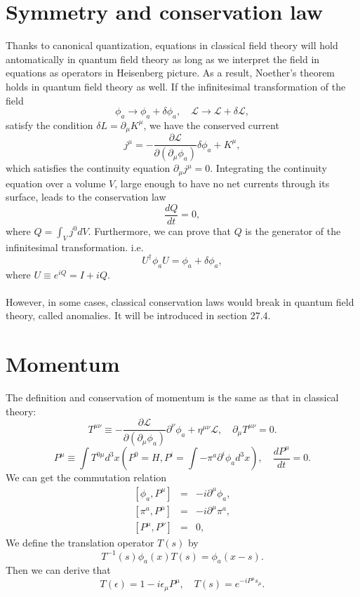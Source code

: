 \section{Symmetry and conservation law}
Thanks to canonical quantization, equations in classical field theory will hold antomatically in quantum field theory as long as we interpret the field in equations as operators in Heisenberg picture. As a result, Noether's theorem holds in quantum field theory as well. 
If the infinitesimal transformation of the field
\begin{equation}
    \phi_a \to \phi_a + \delta \phi_a, \quad  \mathcal{L} \to \mathcal{L} + \delta \mathcal{L},
\end{equation}
satisfy the condition $\delta L = \partial_{\mu} K^{\mu}$, we have the conserved current
\begin{equation}
    j^{\mu} = - \frac{\partial \mathcal{L}}{\partial (\partial_{\mu} \phi_a)}\delta \phi_a + K^{\mu},
\end{equation}
which satisfies the continuity equation $\partial _{\mu} j^{\mu} = 0$. 
Integrating the continuity equation over a volume $V$, large enough to have no net currents through its surface, leads to the conservation law
\begin{equation}
    \frac{d Q}{dt} = 0,
\end{equation}
where $Q = \int_{V} j^0 dV$. 
Furthermore, we can prove that $Q$ is the generator of the infinitesimal transformation. i.e.
\begin{equation}
    U^{\dagger} \phi_a U = \phi_{a} + \delta \phi_{a},
\end{equation}
where $U \equiv e^{iQ} = I + iQ$.
\\ \\
However, in some cases, classical conservation laws would break in quantum field theory, called anomalies. It will be introduced in section 27.4.

\section{Momentum}
\noindent
The definition and conservation of momentum is the same as that in classical theory:
\[T^{\mu \nu} \equiv -\frac{\partial \mathcal{L}}{\partial(\partial_{\mu}\phi_a)} \partial^{\nu} \phi_a + \eta^{\mu \nu} \mathcal{L} , \quad \partial_{\mu} T^{\mu \nu} = 0.\]
\[P^{\mu} \equiv \int T^{0 \mu} d^3 x \left(P^{0} = H, P^{i} = \int -\pi^a \partial^i \phi_a d^3 x \right), \quad \frac{d P^{\mu}}{dt} = 0. \]
We can get the commutation relation
\begin{eqnarray}
\left[\phi_a,P^{\mu}\right] &=& -i\partial^{\mu} \phi_a, \nonumber \\
\left[\pi^a,P^{\mu}\right] &=& -i\partial^{\mu} \pi^a, \nonumber \\
\left[P^{\mu},P^{\nu}\right] &=& 0 ,\nonumber 
\end{eqnarray}
We define the translation operator $T(s)$ by
\[T^{-1}(s) \phi_a(x) T(s) = \phi_a(x-s).\]
Then we can derive that
\[T(\epsilon) = 1 - i\epsilon_{\mu} P^{\mu} , \quad T(s) = e^{-iP^{\mu}s_{\mu}}.\]

